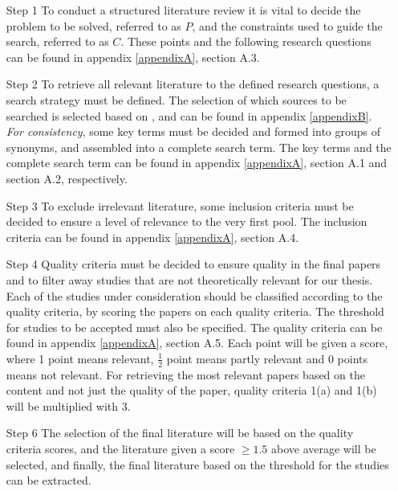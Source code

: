 \begin{itemize}
\item[Step 1] To conduct a structured literature review it is vital to decide the problem to be solved, referred to as $P$, and the constraints used to guide the search, referred to as $C$\citep{kofod2014}. These points and the following research questions can be found in appendix \ref{appendixA}, section A.3. 

\item[Step 2] To retrieve all relevant literature to the defined research questions, a search strategy must be defined. The selection of which sources to be searched is selected based on \citep[p.3]{kofod2014}, and can be found in appendix \ref{appendixB}. \emph{\color{red}For consistency}, some key terms must be decided and formed into groups of synonyms, and assembled into a complete search term.  The key terms and the complete search term can be found in appendix \ref{appendixA}, section A.1 and section A.2, respectively.

\item[Step 3] To exclude irrelevant literature, some inclusion criteria must be decided to ensure a level of relevance to the very first pool. The inclusion criteria can be found in appendix \ref{appendixA}, section A.4. 

\item[Step 4] Quality criteria must be decided to ensure quality in the final papers and to filter away studies that are not theoretically relevant for our thesis. Each of the studies under consideration should be classified according to the quality criteria, by scoring the papers on each quality criteria. The threshold for studies to be accepted must also be specified.
The quality criteria can be found in appendix \ref{appendixA}, section A.5. Each point will be given a score, where 1 point means relevant, $\frac{1}{2}$ point means partly relevant and 0 points means not relevant. For retrieving the most relevant papers based on the content and not just the quality of the paper, quality criteria 1(a) and 1(b) will be multiplied with 3.

\item[Step 6] The selection of the final literature will be based on the quality criteria scores, and the literature given a score $\geq{1.5}$ above average will be selected, and finally, the final literature based on the threshold for the studies can be extracted. 
\end{itemize}

